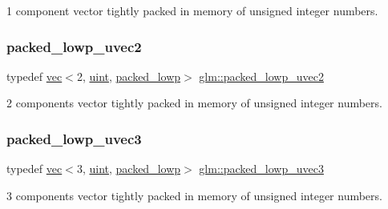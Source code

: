 1 component vector tightly packed in memory of unsigned integer numbers. 

\mbox{\label{group__gtc__type__aligned_ga48ab6ca01a9d2418365ca7c3ea1183e8}} 
\subsubsection{\texorpdfstring{packed\+\_\+lowp\+\_\+uvec2}{packed\_lowp\_uvec2}}
{\footnotesize\ttfamily typedef \hyperlink{structglm_1_1vec}{vec}$<$2, \hyperlink{group__core__precision_ga4fd29415871152bfb5abd588334147c8}{uint}, \hyperlink{namespaceglm_a36ed105b07c7746804d7fdc7cc90ff25ac36a4bd74559be2c0b65bc48e5953b8b}{packed\+\_\+lowp}$>$ \hyperlink{group__gtc__type__aligned_ga48ab6ca01a9d2418365ca7c3ea1183e8}{glm\+::packed\+\_\+lowp\+\_\+uvec2}}



2 components vector tightly packed in memory of unsigned integer numbers. 

\mbox{\label{group__gtc__type__aligned_ga895469f176463355d8b0a4bd8a4eaf45}} 
\subsubsection{\texorpdfstring{packed\+\_\+lowp\+\_\+uvec3}{packed\_lowp\_uvec3}}
{\footnotesize\ttfamily typedef \hyperlink{structglm_1_1vec}{vec}$<$3, \hyperlink{group__core__precision_ga4fd29415871152bfb5abd588334147c8}{uint}, \hyperlink{namespaceglm_a36ed105b07c7746804d7fdc7cc90ff25ac36a4bd74559be2c0b65bc48e5953b8b}{packed\+\_\+lowp}$>$ \hyperlink{group__gtc__type__aligned_ga895469f176463355d8b0a4bd8a4eaf45}{glm\+::packed\+\_\+lowp\+\_\+uvec3}}



3 components vector tightly packed in memory of unsigned integer numbers. 

